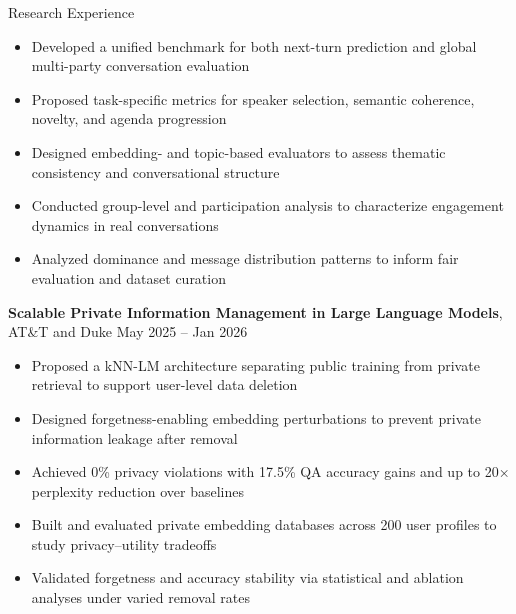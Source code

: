 \documentclass[hidelinks]{resume} %
\begin{document}
\begin{rSection}{R\MakeLowercase{esearch} E\MakeLowercase{xperience}}
\begin{itemize}
\item Developed a unified benchmark for both next-turn prediction and global multi-party conversation evaluation
\item Proposed task-specific metrics for speaker selection, semantic coherence, novelty, and agenda progression
\item Designed embedding- and topic-based evaluators to assess thematic consistency and conversational structure
\item Conducted group-level and participation analysis to characterize engagement dynamics in real conversations
\item Analyzed dominance and message distribution patterns to inform fair evaluation and dataset curation

\end{itemize}

\textbf{Scalable Private Information Management in Large Language Models}, AT\&T and Duke
\hfill May 2025 -- Jan 2026
\vspace{-5pt}
\begin{itemize}
\itemsep -7pt {}

\item Proposed a kNN-LM architecture separating public training from private retrieval to support user-level data deletion
\item Designed forgetness-enabling embedding perturbations to prevent private information leakage after removal
\item Achieved 0\% privacy violations with 17.5\% QA accuracy gains and up to 20× perplexity reduction over baselines
\item Built and evaluated private embedding databases across 200 user profiles to study privacy–utility tradeoffs
\item Validated forgetness and accuracy stability via statistical and ablation analyses under varied removal rates
\end{itemize}


\end{rSection}
\end{document}
